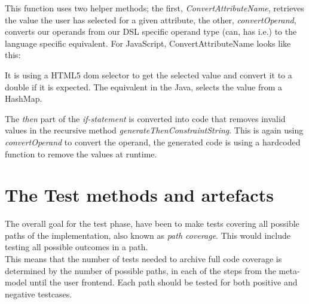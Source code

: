 \documentclass[paper=a4, fontsize=11pt]{scrartcl} %
\numberwithin{equation}{section} %
\numberwithin{figure}{section} %
\numberwithin{table}{section} %
\begin{document}


This function uses two helper methods; the first, \textit{ConvertAttributeName}, retrieves the value the user has selected for a given attribute, the other, \textit{convertOperand}, converts our operands from our DSL specific operand type (can, has i.e.) to the language specific equivalent.
For JavaScript, ConvertAttributeName looks like this:



It is using a HTML5 dom selector to get the selected value and convert it to a double if it is expected.
The equivalent in the Java, selects the value from a HashMap.



The \textit{then} part of the \textit{if-statement} is converted into code that removes invalid values in the recursive method \textit{generateThenConstraintString}. This is again using \textit{convertOperand} to convert the operand, the generated code is using a hardcoded function to remove the values at runtime.




\section{The Test methods and artefacts}
The overall goal for the test phase, have been to make tests covering all possible paths of the implementation, also known as \textit{path coverage}. This would include testing all possible outcomes in a path.\\ 
This means that the number of tests needed to archive full code coverage is determined by the number of possible paths, in each of the steps from the meta-model until the user frontend. Each path should be tested for both positive and negative testcases.\\
\end{document}
